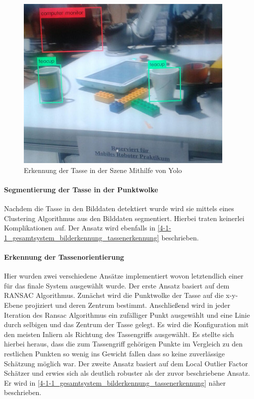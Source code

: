 \begin{figure}
\centering
\includegraphics[scale=0.5]{./images/yolo.jpeg}
\caption{Erkennung der Tasse in der Szene Mithilfe von Yolo \label{fig:yolo}}
\end{figure}

\paragraph{Segmentierung der Tasse in der Punktwolke}
Nachdem die Tasse in den Bilddaten detektiert wurde wird sie mittels eines Clustering Algorithmus aus den Bilddaten segmentiert. Hierbei traten keinerlei Komplikationen auf. Der Ansatz wird ebenfalls in \ref{4-1-1_gesamtsystem_bilderkennung_tassenerkennung} beschrieben.

\paragraph{Erkennung der Tassenorientierung}
Hier wurden zwei verschiedene Ansätze implementiert wovon letztendlich einer für das finale System ausgewählt wurde. Der erste Ansatz basiert auf dem RANSAC Algorithmus. Zunächst wird die Punktwolke der Tasse auf die x-y-Ebene projiziert und deren Zentrum bestimmt. Anschließend wird in jeder Iteration des Ransac Algorithmus ein zufälliger Punkt ausgewählt und eine Linie durch selbigen und das Zentrum der Tasse gelegt. Es wird die Konfiguration mit den meisten Inliern als Richtung des Tassengriffs ausgewählt. Es stellte sich hierbei heraus, dass die zum Tassengriff gehörigen Punkte im Vergleich zu den restlichen Punkten so wenig ins Gewicht fallen dass so keine zuverlässige Schätzung möglich war.
Der zweite Ansatz basiert auf dem Local Outlier Factor Schätzer und erwies sich als deutlich robuster als der zuvor beschriebene Ansatz. Er wird in \ref{4-1-1_gesamtsystem_bilderkennung_tassenerkennung} näher beschrieben.